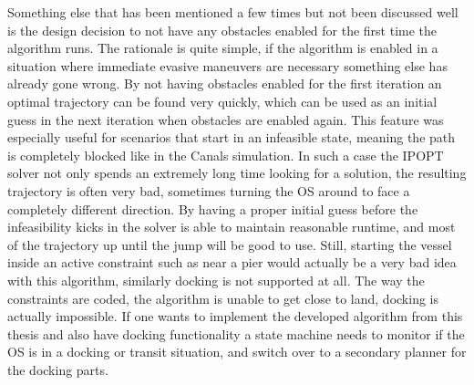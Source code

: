 Something else that has been mentioned a few times but not been discussed well is the design decision to not have any obstacles enabled for the first time the algorithm runs.
The rationale is quite simple, if the algorithm is enabled in a situation where immediate evasive maneuvers are necessary something else has already gone wrong. By not having
obstacles enabled for the first iteration an optimal trajectory can be found very quickly, which can be used as an initial guess in the next iteration when obstacles are enabled again.
This feature was especially useful for scenarios that start in an infeasible state, meaning the path is completely blocked like in the Canals simulation. In such a case the IPOPT
solver not only spends an extremely long time looking for a solution, the resulting trajectory is often very bad, sometimes turning the OS around to face a completely different direction.
By having a proper initial guess before the infeasibility kicks in the solver is able to maintain reasonable runtime, and most of the trajectory up until the jump will be good to use.
Still, starting the vessel inside an active constraint such as near a pier would actually be a very bad idea with this algorithm, similarly docking is not supported at all. The way
the constraints are coded, the algorithm is unable to get close to land, docking is actually impossible. If one wants to implement the developed algorithm from this thesis and also have
docking functionality a state machine needs to monitor if the OS is in a docking or transit situation, and switch over to a secondary planner for the docking parts. 

